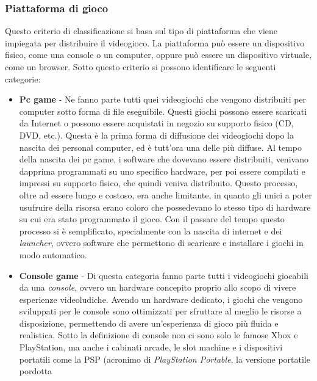        \subsubsection{Piattaforma di gioco}
            Questo criterio di classificazione si basa sul tipo di piattaforma che viene impiegata per distribuire il videogioco. La piattaforma può essere un dispositivo fisico, come
            una console o un computer, oppure può essere un dispositivo virtuale, come un browser. Sotto questo criterio si possono identificare le seguenti categorie:
            \begin{itemize}
                \item \textbf{Pc game} - Ne fanno parte tutti quei videogiochi che vengono distribuiti per computer sotto forma di file eseguibile. Questi giochi possono essere
                    scaricati da Internet o possono essere acquistati in negozio su supporto fisico (CD, DVD, etc.). Questa è la prima forma di diffusione dei videogiochi dopo la
                    nascita dei personal computer, ed è tutt'ora una delle più diffuse. Al tempo della nascita dei pc game, i software che dovevano essere distribuiti, venivano dapprima
                    programmati su uno specifico hardware, per poi essere compilati e impressi su supporto fisico, che quindi veniva distribuito. Questo processo, oltre ad essere
                    lungo e costoso, era anche limitante, in quanto gli unici a poter usufruire della risorsa erano coloro che possedevano lo stesso tipo di hardware su cui era
                    stato programmato il gioco. Con il passare del tempo questo processo si è semplificato, specialmente con la nascita di internet e dei \textit{launcher}, ovvero
                    software che permettono di scaricare e installare i giochi in modo automatico.
                \item \textbf{Console game} - Di questa categoria fanno parte tutti i videogiochi giocabili da una \textit{console}, ovvero un hardware concepito proprio allo scopo
                    di vivere esperienze videoludiche. Avendo un hardware dedicato, i giochi che vengono sviluppati per le console sono ottimizzati per sfruttare al meglio le risorse
                    a disposizione, permettendo di avere un'esperienza di gioco più fluida e realistica. Sotto la definizione di console non ci sono solo le famose Xbox e PlayStation,
                    ma anche i cabinati arcade, le slot machine e i dispositivi portatili come la PSP (acronimo di \textit{PlayStation Portable}, la versione portatile pordotta 

\end{itemize}
